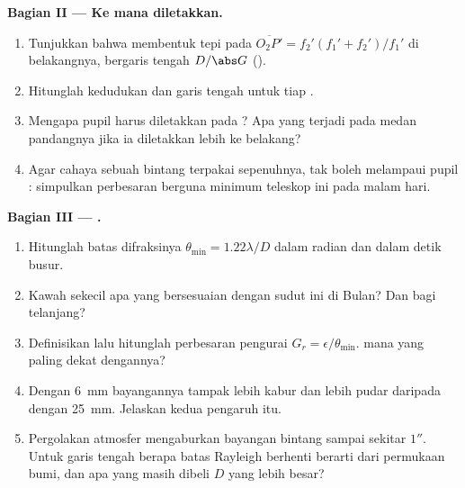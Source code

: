 \begin{problem}
\medskip
\noindent\textbf{Bagian II --- Ke mana  diletakkan.}
\begin{enumerate}[resume]
  \item Tunjukkan bahwa  membentuk  tepi
         pada $\overline{O_2P'} = f_2'(f_1' + f_2')/f_1'$ di
        belakangnya, bergaris tengah $D/\abs G$ ().
  \item Hitunglah kedudukan dan garis tengah  untuk tiap
        .
  \item Mengapa pupil  harus diletakkan pada ? Apa
        yang terjadi pada medan pandangnya jika ia diletakkan lebih ke
        belakang?
  \item Agar cahaya sebuah bintang terpakai sepenuhnya, 
        tak boleh melampaui pupil : simpulkan perbesaran berguna
        minimum teleskop ini pada malam hari.
\end{enumerate}

\medskip
\noindent\textbf{Bagian III --- .}
\begin{enumerate}[resume]
  \item Hitunglah batas difraksinya $\theta_{\min} = 1.22\lambda/D$
        dalam radian dan dalam detik busur.
  \item Kawah sekecil apa yang bersesuaian dengan sudut ini di Bulan?
        Dan bagi  telanjang?
  \item Definisikan lalu hitunglah perbesaran pengurai $G_r =
        \epsilon/\theta_{\min}$.  mana yang paling dekat dengannya?
  \item Dengan  \qty{6}{mm} bayangannya tampak lebih kabur dan
        lebih pudar daripada dengan  \qty{25}{mm}. Jelaskan kedua
        pengaruh itu.
  \item Pergolakan atmosfer mengaburkan bayangan bintang sampai sekitar
        $1''$. Untuk garis tengah  berapa batas Rayleigh
        berhenti berarti dari permukaan bumi, dan apa yang masih dibeli
        $D$ yang lebih besar?
\end{enumerate}


\end{problem}
